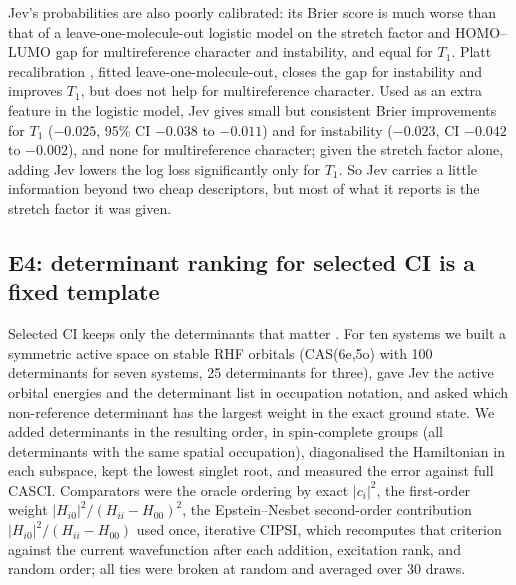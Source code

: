 \documentclass[11pt]{article}
\newcommand{\jev}{Jev}
\begin{document}
\jev{}'s probabilities are also poorly calibrated: its Brier score is much worse than that of a leave-one-molecule-out logistic model on the stretch factor and HOMO--LUMO gap for multireference character and instability, and equal for $T_1$.
Platt recalibration \citep{lin2007note}, fitted leave-one-molecule-out, closes the gap for instability and improves $T_1$, but does not help for multireference character.
Used as an extra feature in the logistic model, \jev{} gives small but consistent Brier improvements for $T_1$ ($-0.025$, 95\% CI $-0.038$ to $-0.011$) and for instability ($-0.023$, CI $-0.042$ to $-0.002$), and none for multireference character; given the stretch factor alone, adding \jev{} lowers the log loss significantly only for $T_1$.
So \jev{} carries a little information beyond two cheap descriptors, but most of what it reports is the stretch factor it was given.

\begin{table}[t]
\centering
\small
\caption{Quantum-chemistry decisions on 48 cases (E3; $T_1$ on 47). All logistic and recalibration models are fitted leave-one-molecule-out. $^a$AUROC of the unfitted stretch factor; Brier score of a leave-one-molecule-out logistic model on it. Molecule-clustered 95\% intervals for AUROC are shown in Fig.~\ref{fig:chemistry}a.}
\label{tab:e3}

\end{table}

\subsection{E4: determinant ranking for selected CI is a fixed template}

Selected CI keeps only the determinants that matter \citep{huron1973iterative,holmes2016heat}.
For ten systems we built a symmetric active space on stable RHF orbitals (CAS(6e,5o) with 100 determinants for seven systems, 25 determinants for three), gave \jev{} the active orbital energies and the determinant list in occupation notation, and asked which non-reference determinant has the largest weight in the exact ground state.
We added determinants in the resulting order, in spin-complete groups (all determinants with the same spatial occupation), diagonalised the Hamiltonian in each subspace, kept the lowest singlet root, and measured the error against full CASCI.
Comparators were the oracle ordering by exact $|c_i|^2$, the first-order weight $|H_{i0}|^2/(H_{ii}-H_{00})^2$, the Epstein--Nesbet second-order contribution $|H_{i0}|^2/(H_{ii}-H_{00})$ used once, iterative CIPSI, which recomputes that criterion against the current wavefunction after each addition, excitation rank, and random order; all ties were broken at random and averaged over 30 draws.
\end{document}
